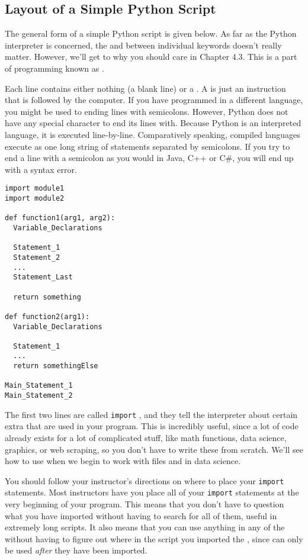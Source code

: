 \subsection{Layout of a Simple Python Script}
The general form of a simple Python script is given below. As far as the Python interpreter is concerned, the  and  between individual keywords doesn't really matter. However, we'll get to why you should care in Chapter 4.3. This is a part of programming known as .\par
Each line contains either nothing (a blank line) or a . A  is just an instruction that is followed by the computer. If you have programmed in a different language, you might be used to ending lines with semicolons. However, Python does not have any special character to end its lines with. Because Python is an interpreted language, it is executed line-by-line. Comparatively speaking, compiled languages execute as one long string of statements separated by semicolons. If you try to end a line with a semicolon as you would in Java, C++ or C\#, you will end up with a syntax error.\par
\begin{lstlisting}[style=pippython]
import module1
import module2

def function1(arg1, arg2):
  Variable_Declarations
  
  Statement_1
  Statement_2
  ...
  Statement_Last
  
  return something

def function2(arg1):
  Variable_Declarations
  
  Statement_1
  ...
  return somethingElse

Main_Statement_1
Main_Statement_2
\end{lstlisting}
The first two lines are called \verb|import| , and they tell the interpreter about certain extra  that are used in your program. This is incredibly useful, since a lot of code already exists for a lot of complicated stuff, like math functions, data science, graphics, or web scraping, so you don't have to write these from scratch. We'll see how to use  when we begin to work with files and in data science.\par
You should follow your instructor's directions on where to place your \verb|import| statements. Most instructors have you place all of your \verb|import| statements at the very beginning of your program. This means that you don't have to question what  you have imported without having to search for all of them, useful in extremely long scripts. It also means that you can use anything in any of the  without having to figure out where in the script you imported the , since  can only be used \textit{after} they have been imported.\par
